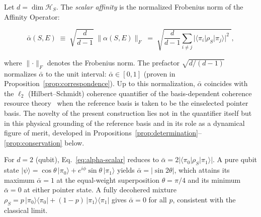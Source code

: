\begin{definition}
\label{def:alpha-scalar}
Let $d = \dim \mathcal{H}_S$.
The \emph{scalar affinity} is the normalized Frobenius norm of
the Affinity Operator:

\begin{equation}
\label{eq:alpha-scalar}
\bar{\alpha}(S,E)
  \;\equiv\;
  \sqrt{\frac{d}{d-1}}\;
  \bigl\lVert \alpha(S,E) \bigr\rVert_F
  \;=\;
  \sqrt{\frac{d}{d-1}\sum_{i \neq j}
    \bigl\lvert
      \langle \pi_i \vert \rho_S \vert \pi_j \rangle
    \bigr\rvert^2\;},
\end{equation}

\noindent
where $\lVert \cdot \rVert_F$ denotes the Frobenius norm.
The prefactor $\sqrt{d/(d-1)}$ normalizes $\bar{\alpha}$ to the
unit interval: $\bar{\alpha} \in [0, 1]$ (proven in
Proposition~\ref{prop:correspondence}).
Up to this normalization, $\bar\alpha$ coincides with the
$\ell_2$ (Hilbert--Schmidt) coherence quantifier of the
basis-dependent coherence resource
theory~\cite{Baumgratz2014,Streltsov2017Review} when the reference
basis is taken to be the einselected pointer basis.
The novelty of the present construction lies not in the quantifier
itself but in this physical grounding of the reference basis and in
its role as a dynamical figure of merit, developed in
Propositions~\ref{prop:determination}--\ref{prop:conservation} below.
\end{definition}

\begin{remark}
\label{rem:boundary}
For $d = 2$ (qubit), Eq.~\eqref{eq:alpha-scalar} reduces to
$\bar{\alpha} = 2\lvert \langle \pi_0 \vert \rho_S \vert \pi_1 \rangle \rvert$.
A pure qubit state $\vert \psi \rangle = \cos\theta\,\vert\pi_0\rangle
+ e^{i\phi}\sin\theta\,\vert\pi_1\rangle$ yields
$\bar{\alpha} = \lvert \sin 2\theta \rvert$, which attains its
maximum $\bar{\alpha} = 1$ at the equal-weight superposition
$\theta = \pi/4$ and its minimum $\bar{\alpha} = 0$ at either
pointer state.
A fully decohered mixture $\rho_S = p\,\vert\pi_0\rangle\langle\pi_0\vert
+ (1-p)\,\vert\pi_1\rangle\langle\pi_1\vert$ gives $\bar{\alpha} = 0$
for all $p$, consistent with the classical limit.
\end{remark}

